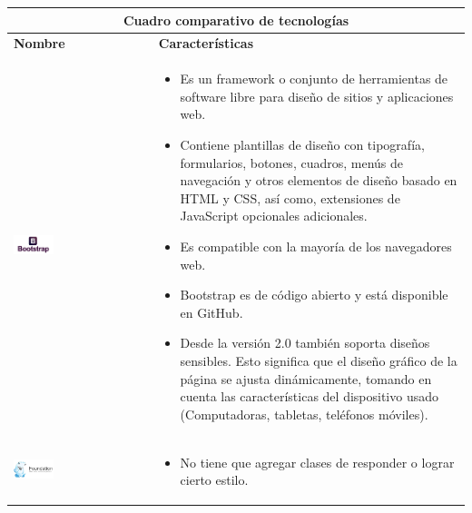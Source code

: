\newpage
\begin{table}[b!]
    \centering
      \begin{tabular}{|p{1cm}|l}
        \hline
        \multicolumn{2}{|c|}{{\bf Cuadro comparativo de tecnologías}} \\ 
        \hline
          \multicolumn{1}{|p{4cm}|}{{\bf Nombre}} & 
		  \multicolumn{1}{p{10cm}|}{{\bf Características}}\\
		 \hline
          \multicolumn{1}{|p{5cm}|}{\includegraphics[width=0.3\textwidth]{images/bootstrap}} & 
          \multicolumn{1}{p{10cm}|}{\begin{itemize} 
       \vspace{-20mm}
          \item Es un framework o conjunto de herramientas de software libre para diseño de sitios y aplicaciones web. 
        \item Contiene plantillas de diseño con tipografía, formularios, botones, cuadros, menús de navegación y otros elementos de diseño basado en HTML y CSS, así como, extensiones de JavaScript opcionales adicionales.
        \item Es compatible con la mayoría de los navegadores web.
        \item Bootstrap es de código abierto y está disponible en GitHub. 
        \item Desde la versión 2.0 también soporta diseños sensibles. Esto significa que el diseño gráfico de la página se ajusta dinámicamente, tomando en cuenta las características del dispositivo usado (Computadoras, tabletas, teléfonos móviles).
        \cite{34}
      \end{itemize}} \\
        \hline
          \multicolumn{1}{|p{5cm}|}{\includegraphics[width=0.3\textwidth]{images/foundation}} & 
          \multicolumn{1}{p{10cm}|}{ 
          \begin{itemize}
                 \vspace{-20mm}
          \setlist[itemize]{noitemsep, topsep=0pt}  
          	\item No tiene que agregar clases de responder o lograr cierto estilo.

\end{itemize}}
\end{tabular}
\end{table}
